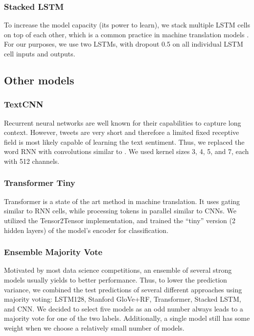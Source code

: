 \documentclass[10pt,conference,compsocconf]{IEEEtran}
\begin{document}
\subsubsection{Stacked LSTM}
To increase the model capacity (its power to learn), we stack multiple LSTM cells on top of each other, which is a common practice in machine translation models \cite{zeroshot}. For our purposes, we use two LSTMs, with dropout 0.5 \cite{dropout1,dropout2} on all individual LSTM cell inputs and outputs.


\subsection{Other models}

\subsubsection{TextCNN}
Recurrent neural networks are well known for their capabilities to capture long context. However, tweets are very short and therefore a limited fixed receptive field is most likely capable of learning the text sentiment. Thus, we replaced the word RNN with convolutions similar to \cite{TextCNN}. We used kernel sizes 3, 4, 5, and 7, each with 512 channels.

\subsubsection{Transformer Tiny}
Transformer \cite{transformer} is a state of the art method in machine translation. It uses gating similar to RNN cells, while processing tokens in parallel similar to CNNs. We utilized the Tensor2Tensor \cite{tensor2tensor} implementation, and trained the ``tiny'' version (2 hidden layers) of the model's encoder for classification.

\subsubsection{Ensemble Majority Vote}
Motivated by most data science competitions, an ensemble of several strong models usually yields to better performance. Thus, to lower the prediction variance, we combined the test predictions of several different approaches using majority voting: LSTM128, Stanford GloVe+RF, Transformer, Stacked LSTM, and CNN. We decided to select five models as an odd number always leads to a majority vote for one of the two labels. Additionally, a single model still has some weight when we choose a relatively small number of models.
\end{document}

